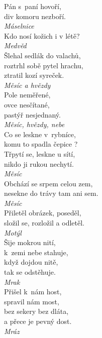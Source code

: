 \begin{multicols}{3}
\noindent
Pán s~paní hovoří,\\
div komoru nezboří.\\[1 mm]
{\sl Máselnice}\\

\noindent
Kdo nosí kožich i v létě?\\[1 mm]
{\sl Medvěd}\\

\noindent
Šlehal sedlák do valachů,\\
roztrhl sobě pytel hrachu,\\
ztratil kozí syreček.\\[1 mm]
{\sl Měsíc a hvězdy}\\

\noindent
Pole neměřené,\\
ovce nesčítané,\\
pastýř nesjednaný.\\[1 mm]
{\sl Měsíc, hvězdy, nebe}\\

\noindent
Co se leskne v~rybníce,\\
komu to spadla čepice ?\\
Třpytí se, leskne u sítí,\\
nikdo ji rukou nechytí.\\[1 mm]
{\sl Měsíc}\\

\noindent
Obchází se srpem celou zem,\\
nesekne do trávy tam ani sem.\\[1 mm]
{\sl Měsíc}\\

\noindent
Přiletěl obrázek, poseděl,\\
složil se, rozložil a odletěl.\\[1 mm]
{\sl Motýl}\\

\noindent
Šije mokrou nití,\\
k~zemi nebe stahuje,\\
když dojdou nitě,\\
tak se odstěhuje.\\[1 mm]
{\sl Mrak}\\

\noindent
Přišel k~nám host,\\
spravil nám most,\\
bez sekery bez dláta,\\
a přece je pevný dost.\\[1 mm]
{\sl Mráz}\\


\end{multicols}
